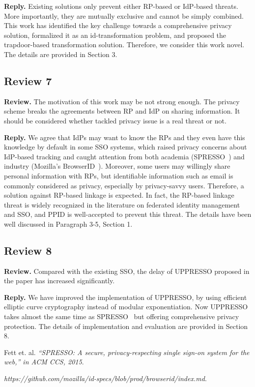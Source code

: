\documentclass[letterpaper,onecolumn,10pt]{article}
\begin{document}
\noindent\textbf{Reply.}  Existing solutions only prevent either RP-based or IdP-based threats. More importantly, they are mutually exclusive and cannot be simply combined. This work has identified the key challenge towards a comprehensive privacy solution, formalized it as an id-transformation problem, and proposed the trapdoor-based transformation solution. Therefore, we consider this work novel. The details are provided in Section 3.


\subsection{Review 7}
\noindent\textbf{Review.}  The motivation of this work may be not strong enough.  The privacy scheme breaks the agreements between RP and IdP on sharing information. It should be considered whether tackled privacy issue is a real threat or not. 

\noindent\textbf{Reply.}  
We agree that IdPs may want to know the RPs and they even have this knowledge by default in some SSO systems, which raised privacy concerns about IdP-based tracking and caught attention from both academia (SPRESSO~\cite{spresso}) and industry (Mozilla’s BrowserID~\cite{browserid}).
Moreover, some users may willingly share personal information with RPs, but identifiable information such as email is commonly considered as privacy, especially by privacy-savvy users. Therefore, a solution against RP-based linkage is expected. In fact, the RP-based linkage threat is widely recognized in the literature on federated identity management and SSO, and PPID is well-accepted to prevent this threat. The details have been well discussed in Paragraph 3-5, Section 1.

\subsection{Review 8}
\noindent\textbf{Review.}  Compared with the existing SSO, the delay of UPPRESSO proposed in the paper has increased significantly.

\noindent\textbf{Reply.}  We have improved the implementation of UPPRESSO, by using efficient elliptic curve cryptography instead of modular exponentiation. Now UPPRESSO takes  almost the same time as SPRESSO~\cite{spresso} but offering comprehensive privacy protection. The details of implementation and  evaluation are provided in Section 8.

\begin{thebibliography}{9}
Fett et. al. 
\textit{“SPRESSO: A secure, privacy-respecting single sign-on system for the web,” in ACM CCS, 2015}. 

\textit{https://github.com/mozilla/id-specs/blob/prod/browserid/index.md}. 
\end{thebibliography}
\end{document}
